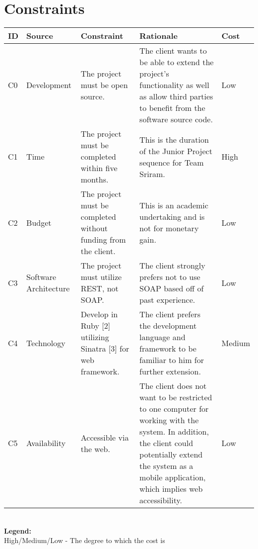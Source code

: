 \documentclass{article}
\begin{document}
\section{Constraints}
\begin{tabular}{ | p{0.15in} | p{0.75in} | p{1.8in} | p{2.3in} | p{0.5in} | }
\hline
\textbf{ID} & \textbf{Source} & \textbf{Constraint} & \textbf{Rationale} & \textbf{Cost}\\
\hline
\hline
C0 & Development & The project must be open source. & The client wants to be able to extend the project's functionality as well as allow third parties to benefit from the software source code. & Low \\
\hline
C1 & Time & The project must be completed within five months. & This is the duration of the Junior Project sequence for Team Sriram. & High \\
\hline
C2 & Budget & The project must be completed without funding from the client. & This is an academic undertaking and is not for monetary gain. & Low \\
\hline
C3 & Software Architecture & The project must utilize REST, not SOAP. & The client strongly prefers not to use SOAP based off of past experience. & Low \\
\hline
C4 & Technology & Develop in Ruby [2] utilizing Sinatra [3] for web framework. & The client prefers the development language and framework to be familiar to him for further extension. & Medium \\
\hline
C5 & Availability & Accessible via the web. & The client does not want to be restricted to one computer for working with the system.  In addition, the client could potentially extend the system as a mobile application, which implies web accessibility. & Low\\
\hline
\end{tabular} \\
\textbf{Legend:} \\
High/Medium/Low - The degree to which the cost is \\
\end{document}

